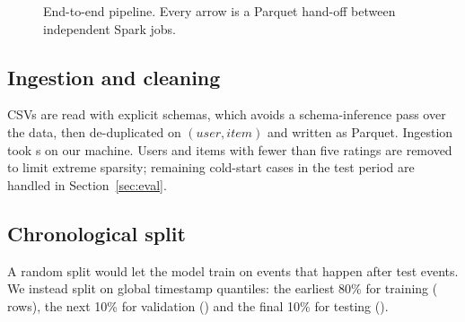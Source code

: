 \documentclass[conference]{IEEEtran}
\begin{document}
\begin{figure}[t]
\centering
{}
\caption{End-to-end pipeline. Every arrow is a Parquet hand-off between independent Spark jobs.}
\label{fig:arch}
\end{figure}

\subsection{Ingestion and cleaning}
CSVs are read with explicit schemas, which avoids a schema-inference pass over the data, then de-duplicated on $(user,item)$ and written as Parquet. Ingestion took \ingestSec{} s on our machine. Users and items with fewer than five ratings are removed to limit extreme sparsity; remaining cold-start cases in the test period are handled in Section~\ref{sec:eval}.

\subsection{Chronological split}
A random split would let the model train on events that happen after test events. We instead split on global timestamp quantiles: the earliest 80\% for training (\nTrain{} rows), the next 10\% for validation (\nVal{}) and the final 10\% for testing (\nTest{}).
\end{document}
